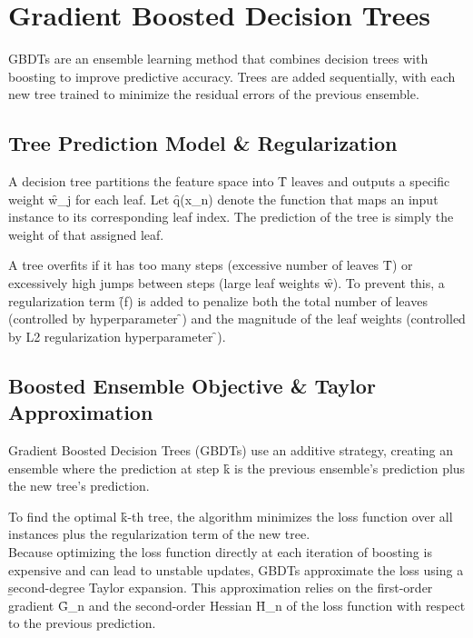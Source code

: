 \section{Gradient Boosted Decision Trees}
GBDTs are an ensemble learning method that combines decision trees with boosting to improve predictive accuracy. Trees are added sequentially, with each new tree trained to minimize the residual errors of the previous ensemble. 




\subsection{Tree Prediction Model \& Regularization}
A decision tree partitions the feature space into \f{T} leaves and outputs a specific weight \f{w_j} for each leaf. Let \f{q(x_n)} denote the function that maps an input instance to its corresponding leaf index. The prediction of the tree is simply the weight of that assigned leaf.

A tree overfits if it has too many steps (excessive number of leaves \f{T}) or excessively high jumps between steps (large leaf weights \f{w}). To prevent this, a regularization term \f{\Omega(f)} is added to penalize both the total number of leaves (controlled by hyperparameter \f{\gamma}) and the magnitude of the leaf weights (controlled by L2 regularization hyperparameter \f{\lambda}).





\subsection{Boosted Ensemble Objective \& Taylor Approximation}
Gradient Boosted Decision Trees (GBDTs) use an additive strategy, creating an ensemble where the prediction at step \f{k} is the previous ensemble's prediction plus the new tree's prediction.

To find the optimal \f{k}-th tree, the algorithm minimizes the loss function over all instances plus the regularization term of the new tree.\\ Because optimizing the loss function directly at each iteration of boosting is expensive and can lead to unstable updates, GBDTs approximate the loss using a \b{second-degree Taylor expansion}. This approximation relies on the first-order gradient \f{G_n} and the second-order Hessian \f{H_n} of the loss function with respect to the previous prediction.








